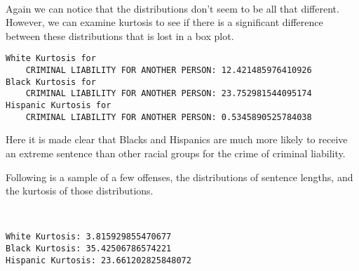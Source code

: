 \documentclass[11pt]{article}
\begin{document}
    \begin{center}
    \end{center}
    { \hspace*{\fill} \\}
    
    Again we can notice that the distributions don't seem to be all that
different. However, we can examine kurtosis to see if there is a
significant difference between these distributions that is lost in a box
plot.

    \begin{Verbatim}[commandchars=\\\{\}]
White Kurtosis for
	CRIMINAL LIABILITY FOR ANOTHER PERSON: 12.421485976410926
Black Kurtosis for
	CRIMINAL LIABILITY FOR ANOTHER PERSON: 23.752981544095174
Hispanic Kurtosis for
	CRIMINAL LIABILITY FOR ANOTHER PERSON: 0.5345890525784038

    \end{Verbatim}

    Here it is made clear that Blacks and Hispanics are much more likely to
receive an extreme sentence than other racial groups for the crime of
criminal liability.

Following is a sample of a few offenses, the distributions of sentence
lengths, and the kurtosis of those distributions.

    \begin{center}
    \end{center}
    { \hspace*{\fill} \\}
    
    \begin{Verbatim}[commandchars=\\\{\}]
White Kurtosis: 3.815929855470677
Black Kurtosis: 35.42506786574221
Hispanic Kurtosis: 23.661202825848072

    \end{Verbatim}

    \begin{center}
    \end{center}
    { \hspace*{\fill} \\}
    
\end{document}

